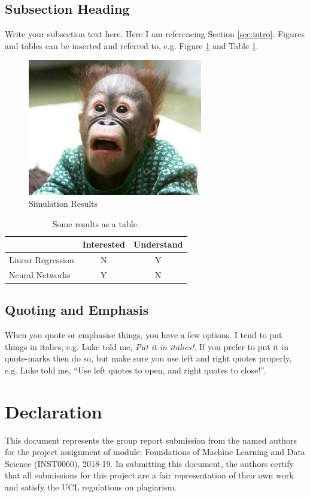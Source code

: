 \documentclass[11point]{article}
\begin{document}
\subsection{Subsection Heading}
Write your subsection text here. Here I am referencing Section \ref{sec:intro}. Figures and tables can be inserted and referred to, e.g. Figure \ref{fig:simulation_figure} and Table \ref{tbl:results_table}.

\begin{figure}
    \centering
    \includegraphics[width=3.0in]{myfigure}
    \caption{Simulation Results}
    \label{fig:simulation_figure}
\end{figure}

\begin{table}[htb]
  \centering
  \begin{tabular}{lcc}
  \toprule
  & Interested & Understand \\
  \midrule
  Linear Regression & N & Y \\
  Neural Networks & Y & N \\
  \bottomrule
  \end{tabular}
  \caption{Some results as a table.}
  \label{tbl:results_table}
\end{table}

\subsection{Quoting and Emphasis}
When you quote or emphasise things, you have a few options. I tend to put things in italics, e.g. Luke told me, \emph{Put it in italics!}. If you prefer to put it in quote-marks then do so, but make sure you use left and right quotes properly, e.g. Luke told me, ``Use left quotes to open, and right quotes to close!''.








\section*{Declaration}
This document represents the group report submission from the named authors for the project assignment of module: Foundations of Machine Learning and Data Science (INST0060), 2018-19. In submitting this document, the authors certify that all submissions for this project are a fair representation of their own work and satisfy the UCL regulations on  plagiarism.



\end{document}

